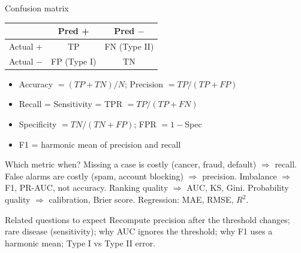 {\begin{block}{Confusion matrix}
		\begin{center}\scriptsize
			\begin{tabular}{@{}lcc@{}}
				\toprule
				& Pred + & Pred $-$ \\
				\midrule
				Actual + & TP & FN (Type II) \\
				Actual $-$ & FP (Type I) & TN \\
				\bottomrule
		\end{tabular}\end{center}
		\begin{itemize}
			\item Accuracy $=(TP+TN)/N$; Precision $=TP/(TP+FP)$
			\item Recall = Sensitivity = TPR $=TP/(TP+FN)$
			\item Specificity $=TN/(TN+FP)$; FPR $=1-$Spec
			\item F1 = harmonic mean of precision and recall
\end{itemize}\end{block}}
{\begin{block}{Which metric when?}
		Missing a case is costly (cancer, fraud, default) $\Rightarrow$ recall. False alarms are costly (spam, account blocking) $\Rightarrow$ precision. Imbalance $\Rightarrow$ F1, PR-AUC, not accuracy. Ranking quality $\Rightarrow$ AUC, KS, Gini. Probability quality $\Rightarrow$ calibration, Brier score. Regression: MAE, RMSE, $R^2$.
	\end{block}
	\begin{alertblock}{Related questions to expect}
		Recompute precision after the threshold changes; rare disease (sensitivity); why AUC ignores the threshold; why F1 uses a harmonic mean; Type I vs Type II error.
\end{alertblock}}

